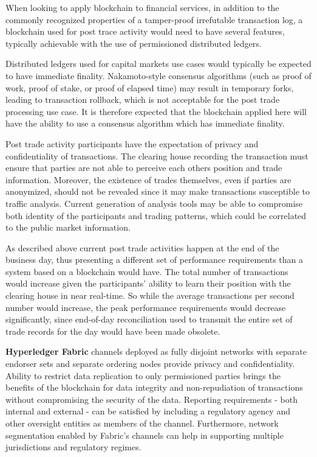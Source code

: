 When looking to apply blockchain to financial services, in addition to the commonly recognized properties of a tamper-proof irrefutable transaction log, a blockchain used for post trace activity would need to have several features, typically achievable with the use of permissioned distributed ledgers.

Distributed ledgers used for capital markets use cases would typically be expected to have immediate finality. Nakamoto-style consensus algorithms (such as proof of work, proof of stake, or proof of elapsed time) may result in temporary forks, leading to transaction rollback, which is not acceptable for the post trade processing use case. It is therefore expected that the blockchain applied here will have the ability to use a consensus algorithm which has immediate finality.

Post trade activity participants have the expectation of privacy and confidentiality of transactions. The clearing house recording the transaction must ensure that parties are not able to perceive each others position and trade information. Moreover, the existence of trades themselves, even if parties are anonymized, should not be revealed since it may make transactions susceptible to traffic analysis. Current generation of analysis tools may be able to compromise both identity of the participants and trading patterns, which could be correlated to the public market information.

As described above current post trade activities happen at the end of the business day, thus presenting a different set of performance requirements than a system based on a blockchain would have. The total number of transactions would increase given the participants' ability to learn their position with the clearing house in near real-time. So while the average transactions per second number would increase, the peak performance requirements would decrease significantly, since end-of-day reconciliation used to transmit the entire set of trade records for the day would have been made obsolete.

\textbf{Hyperledger Fabric} channels deployed as fully disjoint networks with separate endorser sets and separate ordering nodes provide privacy and confidentiality. Ability to restrict data replication to only permissioned parties brings the benefits of the blockchain for data integrity and non-repudiation of transactions without compromising the security of the data. Reporting requirements - both internal and external - can be satisfied by including a regulatory agency and other oversight entities as members of the channel. Furthermore, network segmentation enabled by Fabric's channels can help in supporting multiple jurisdictions and regulatory regimes.

